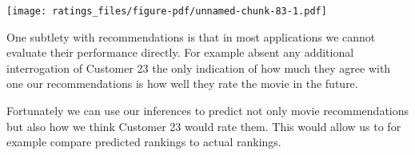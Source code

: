 \documentclass[
  letterpaper,
  DIV=11,
  numbers=noendperiod]{scrartcl}
\newenvironment{Shaded}{\begin{snugshade}}{\end{snugshade}}
\newcommand{\AttributeTok}[1]{\textcolor[rgb]{0.40,0.45,0.13}{#1}}
\newcommand{\ControlFlowTok}[1]{\textcolor[rgb]{0.00,0.23,0.31}{#1}}
\newcommand{\DecValTok}[1]{\textcolor[rgb]{0.68,0.00,0.00}{#1}}
\newcommand{\FunctionTok}[1]{\textcolor[rgb]{0.28,0.35,0.67}{#1}}
\newcommand{\NormalTok}[1]{\textcolor[rgb]{0.00,0.23,0.31}{#1}}
\newcommand{\OtherTok}[1]{\textcolor[rgb]{0.00,0.23,0.31}{#1}}
\newcommand{\SpecialCharTok}[1]{\textcolor[rgb]{0.37,0.37,0.37}{#1}}
\newcommand{\StringTok}[1]{\textcolor[rgb]{0.13,0.47,0.30}{#1}}
\begin{document}
\begin{Shaded}
\end{Shaded}

\texttt{[image: ratings\_files/figure-pdf/unnamed-chunk-83-1.pdf]}

One subtlety with recommendations is that in most applications we cannot
evaluate their performance directly. For example absent any additional
interrogation of Customer 23 the only indication of how much they agree
with one our recommendations is how well they rate the movie in the
future.

Fortunately we can use our inferences to predict not only movie
recommendations but also how we think Customer 23 would rate them. This
would allow us to for example compare predicted rankings to actual
rankings.
\end{document}
